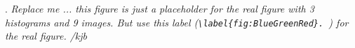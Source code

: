 \label{fig:BlueGreenRed}. \textit{Replace me ... this figure is just a placeholder for the real figure with 3 histograms and 9 images. But use this label (\verb|\label{fig:BlueGreenRed}. |) for the real figure. /kjb}